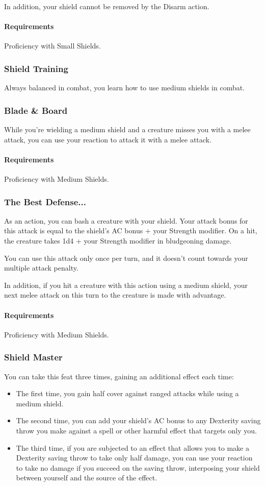     In addition, your shield cannot be removed by the Disarm action.
    \paragraph{Requirements} Proficiency with Small Shields.
\subsubsection{Shield Training} \label{feat::shieldtraining}
    Always balanced in combat, you learn how to use medium shields in combat.
\subsubsection{Blade \& Board} \label{feat::bladeandboard}
    While you're wielding a medium shield and a creature misses you with a melee attack, you can use your reaction to attack it with a melee attack.
    \paragraph{Requirements} Proficiency with Medium Shields.
\subsubsection{The Best Defense...} \label{feat::thebestdefense}
    As an action, you can bash a creature with your shield.
    Your attack bonus for this attack is equal to the shield's AC bonus + your Strength modifier.
    On a hit, the creature takes 1d4 + your Strength modifier in bludgeoning damage.

    You can use this attack only once per turn, and it doesn't count towards your multiple attack penalty.

    In addition, if you hit a creature with this action using a medium shield, your next melee attack on this turn to the creature is made with advantage.
    \paragraph{Requirements} Proficiency with Medium Shields.
\subsubsection{Shield Master} \label{feat::shieldmaster}
    You can take this feat three times, gaining an additional effect each time:
    \begin{itemize}
        \item The first time, you gain half cover against ranged attacks while using a medium shield.
        \item The second time, you can add your shield's AC bonus to any Dexterity saving throw you make against a spell or other harmful effect that targets only you.
        \item The third time, if you are subjected to an effect that allows you to make a Dexterity saving throw to take only half damage, you can use your reaction to take no damage if you succeed on the saving throw, interposing your shield between yourself and the source of the effect.
    \end{itemize}
